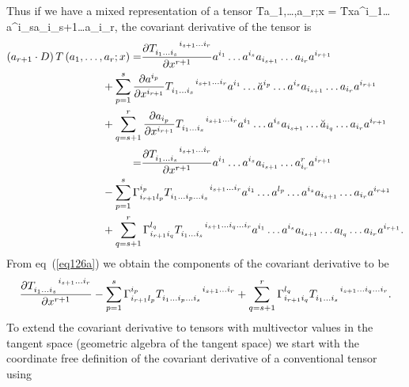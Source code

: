 Thus if we have a mixed representation of a tensor 
\be
\f{T}{a_{1},\dots,a_{r};x} = 
	\f{T}{x}a^{i_{1}}\dots a^{i_{s}}a_{i_{s+1}}\dots a_{i_{r}},
\ee
the covariant derivative of the tensor is
\begin{align}
	\paren{a_{r+1}\cdot D} \f{T}{a_{1},\dots,a_{r};x} =& 
		\pdiff{T\indices{_{i_{1}\dots i_{s}}^{i_{s+1}\dots i_{r}}}}{x^{r+1}}a^{i_{1}}\dots a^{i_{s}}a_{i_{s+1}}\dots a_{i_{r}}
		a^{i_{r+1}} \nonumber \\
		&\hspace{-0.5in}+ \sum_{p=1}^{s}\pdiff{a^{i_{p}}}{x^{i_{r+1}}}T\indices{_{i_{1}\dots i_{s}}^{i_{s+1}\dots i_{r}}}a^{i_{1}}\dots
		\breve{a}^{i_{p}}\dots a^{i_{s}}a_{i_{s+1}}\dots a_{i_{r}}a^{i_{r+1}} \nonumber \\
		&\hspace{-0.5in}+ \sum_{q=s+1}^{r}\pdiff{a_{i_{p}}}{x^{i_{r+1}}}T\indices{_{i_{1}\dots i_{s}}^{i_{s+1}\dots i_{r}}}a^{i_{1}}\dots
		a^{i_{s}}a_{i_{s+1}}\dots\breve{a}_{i_{q}}\dots a_{i_{r}}a^{i_{r+1}} \nonumber \\
		=& \pdiff{T\indices{_{i_{1}\dots i_{s}}^{i_{s+1}\dots i_{r}}}}{x^{r+1}}a^{i_{1}}\dots a^{i_{s}}a_{i_{s+1}}\dots a^{r}_{i_{r}}
		a^{i_{r+1}} \nonumber \\
		&\hspace{-0.5in}- \sum_{p=1}^{s}\Gamma_{i_{r+1}l_{p}}^{i_{p}}T\indices{_{i_{1}\dots i_{p}\dots i_{s}}^{i_{s+1}
		\dots i_{r}}}a^{i_{1}}\dots
		a^{l_{p}}\dots a^{i_{s}}a_{i_{s+1}}\dots a_{i_{r}}a^{i_{r+1}} \nonumber \\
		&\hspace{-0.5in}+ \sum_{q=s+1}^{r}\Gamma_{i_{r+1}i_{q}}^{l_{q}}T\indices{_{i_{1}\dots i_{s}}^{i_{s+1}\dots i_{q}
		\dots i_{r}}}a^{i_{1}}\dots
		a^{i_{s}}a_{i_{s+1}}\dots a_{l_{q}}\dots a_{i_{r}}a^{i_{r+1}}	.	\label{eq126a}
\end{align}
From eq~(\ref{eq126a}) we obtain the components of the covariant derivative to be
\begin{align}
	\pdiff{T\indices{_{i_{1}\dots i_{s}}^{i_{s+1}\dots i_{r}}}}{x^{r+1}}
	- \sum_{p=1}^{s}\Gamma_{i_{r+1}l_{p}}^{i_{p}}T\indices{_{i_{1}\dots i_{p}\dots i_{s}}^{i_{s+1}\dots i_{r}}}
	+ \sum_{q=s+1}^{r}\Gamma_{i_{r+1}i_{q}}^{l_{q}}T\indices{_{i_{1}\dots i_{s}}^{i_{s+1}\dots i_{q}\dots i_{r}}}.
\end{align}
To extend the covariant derivative to tensors with multivector values in the tangent space (geometric algebra of the
tangent space) we start with the coordinate free definition of the covariant derivative of a conventional tensor using
